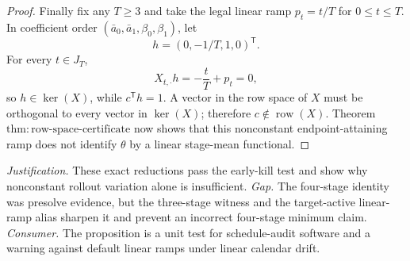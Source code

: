 \documentclass{article}
\begin{document}
\begin{proof}
Finally fix any \(T\ge3\) and take the legal linear ramp \(p_t=t/T\) for \(0\le t\le T\).  In coefficient order \((\bar a_0,\bar a_1,\beta_0,\beta_1)\), let
\[
 h=(0,-1/T,1,0)^{\mathsf T}.
\]
For every \(t\in J_T\),
\[
 X_{t,\cdot}h=-\frac{t}{T}+p_t=0,
\]
so \(h\in\ker(X)\), while \(c^{\mathsf T}h=1\).  A vector in the row space of \(X\) must be orthogonal to every vector in \(\ker(X)\); therefore \(c\notin\operatorname{row}(X)\).  Theorem \(\mathrm{thm:row\text{-}space\text{-}certificate}\) now shows that this nonconstant endpoint-attaining ramp does not identify \(\theta\) by a linear stage-mean functional.
\end{proof}
\par\smallskip\noindent \textit{Justification.} These exact reductions pass the early-kill test and show why nonconstant rollout variation alone is insufficient. \textit{Gap.} The four-stage identity was presolve evidence, but the three-stage witness and the target-active linear-ramp alias sharpen it and prevent an incorrect four-stage minimum claim. \textit{Consumer.} The proposition is a unit test for schedule-audit software and a warning against default linear ramps under linear calendar drift.
\end{document}
